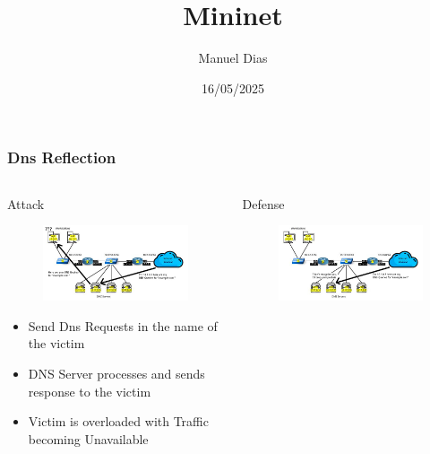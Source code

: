 \documentclass{beamer}
\title{Mininet}
\author{Manuel Dias}
\institute{UCLouvain}
\date{16/05/2025}
\begin{document}
\frame{\titlepage}


\begin{frame}
\frametitle{Dns Reflection}
\begin{columns}
    \begin{column}{0.5\textwidth}
        \Large Attack
        \begin{figure}
            \centering
            \includegraphics[width=\textwidth]{dns_attack.jpg}\\
        \end{figure}
            \begin{itemize}[label={}]
                \item \footnotesize Send Dns Requests in the name of the victim
                \item \footnotesize DNS Server processes and sends response to the victim
                \item \footnotesize Victim is overloaded with Traffic becoming Unavailable
            \end{itemize}
    \end{column}
    \begin{column}{0.5\textwidth}
        \Large Defense
        \begin{figure}
            \centering
            \includegraphics[width=\textwidth]{dns_defense.jpg}\\

\end{figure}
\end{column}
\end{columns}
\end{frame}
\end{document}
